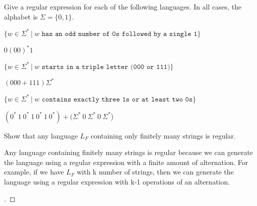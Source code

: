 \documentclass[12pt]{article}
\newenvironment{exercise}[2][Exercise]{\begin{trivlist}
\item[\hskip \labelsep {\bfseries #1}\hskip \labelsep {\bfseries #2.}]}{\end{trivlist}}
\newenvironment{solution}[1][{\color{red} Solution:}]{\begin{trivlist}
\item[\hskip \labelsep {\bfseries #1}\hskip \labelsep {\bfseries}]}{\end{trivlist}}
\begin{document}
\begin{exercise}{2}

Give a regular expression for each of the following languages. In all cases, the alphabet is $\Sigma = \{0,1\}$.
\begin{enumerate}[(a)]
	\item $\{ w \in \Sigma^* \ | \ w \texttt{ has an odd number of 0s followed by a single 1}\}$
	\begin{solution}
 $0(00)^*1$
	\end{solution}
	
	\item $\{w \in \Sigma^* \ | \ w \texttt{ starts in a triple letter (000 or 111)}\}$
	\begin{solution}
 $(000 + 111) \Sigma^*$
	\end{solution}
	
	\item $\{w \in \Sigma^* \ | \ w \texttt{ contains exactly three 1s or at least two 0s}\}$
	\begin{solution}
 $(0^* \ 1 \ 0^* \ 1 \ 0^* \ 1 \  0^*)  + (\Sigma^* \ 0  \ \Sigma^* \ 0 \ \Sigma^* $)
	\end{solution}
	
\end{enumerate}

\end{exercise}

\clearpage
\begin{exercise}{3}
Show that any language $L_F$ containing only finitely many strings is regular.
\end{exercise}

\begin{solution}
 Any language containing finitely many strings is regular because we can generate the language using a regular expression with a finite amount of alternation. For example, if we have $L_F$ with k number of strings, then we can generate the language using a regular expression with k-1 operations of an alternation.



\begin{proof}[\unskip\nopunct]
   \qedhere
\end{proof}

\end{solution}
\end{document}
